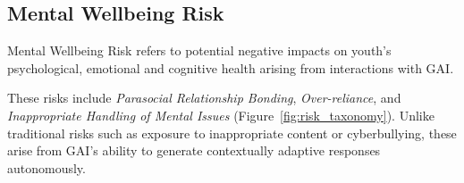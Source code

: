

\vspace{-8pt}
\subsection{Mental Wellbeing Risk}
\begin{boxH}
Mental Wellbeing Risk refers to potential negative impacts on youth's psychological, emotional and cognitive health arising from interactions with GAI.
\end{boxH}
These risks include \textit{Parasocial Relationship Bonding}, \textit{Over-reliance}, and \textit{Inappropriate Handling of Mental Issues} (Figure~\ref{fig:risk_taxonomy}). Unlike traditional risks such as exposure to inappropriate content or cyberbullying, these arise from GAI’s ability to generate contextually adaptive responses autonomously.


